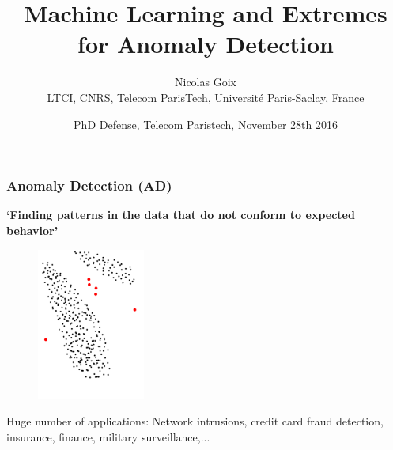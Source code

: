 \documentclass[9pt]{beamer}
\title{
Machine Learning and Extremes  for Anomaly Detection
}
\author[Nicolas Goix]{ Nicolas Goix \\
 {\tiny LTCI, CNRS, Telecom ParisTech, Université Paris-Saclay, France 
 }
}
\date{PhD Defense, Telecom Paristech, November 28th 2016}
\begin{document}
\begin{frame}
 \titlepage
\end{frame}







\begin{frame}
\frametitle{Anomaly Detection (AD)}

\textbf{`Finding patterns in the data that do not conform to expected behavior'}
\begin{figure}
\includegraphics[height=5cm]{AD_intro.png}
\end{figure}
Huge number of applications: Network intrusions, credit card fraud detection, insurance, finance, military surveillance,... \\~\\
\end{frame}
\end{document}
